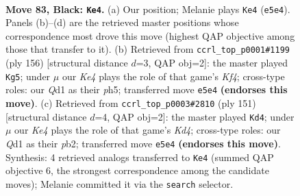 \documentclass[11pt]{article}
\begin{document}
\clearpage

\begin{figure}[p]\centering
\begin{subfigure}{0.46\textwidth}\centering
\resizebox{\linewidth}{!}{%
\newchessgame
\chessboard[
  setfen={8/8/1p6/p3k3/2P5/8/K7/3q4 b - - 23 83},
  showmover=false,
  pgfstyle=straightmove, color=movearrow, markmove={e5-e4}
]}
\caption{}
\end{subfigure}\hfill
\begin{subfigure}{0.46\textwidth}\centering
\resizebox{\linewidth}{!}{%
\newchessgame
\chessboard[
  setfen={6k1/8/8/p6p/2P2K2/1P6/8/8 w - - 5 79},
  showmover=false,
  pgfstyle=straightmove, color=movearrow, markmove={f4-g5}
]}
\caption{}
\end{subfigure}
\\[4pt]
\begin{subfigure}{0.46\textwidth}\centering
\resizebox{\linewidth}{!}{%
\newchessgame
\chessboard[
  setfen={8/6p1/6Pp/3k4/8/5K2/1P6/8 b - - 4 76},
  showmover=false,
  pgfstyle=straightmove, color=movearrow, markmove={d5-d4}
]}
\caption{}
\end{subfigure}\hfill

\caption{\textbf{Move 83, Black: \texttt{Ke4}.} (a) Our position; Melanie plays \texttt{Ke4} (\texttt{e5e4}). Panels (b)--(d) are the retrieved master positions whose correspondence most drove this move (highest QAP objective among those that transfer to it). (b) Retrieved from \texttt{ccrl\_top\_p0001\#1199} (ply 156) [structural distance $d$=3, QAP obj=2]: the master played \texttt{Kg5}; under $\mu$ our \emph{Ke4} plays the role of that game's \emph{Kf4}; cross-type roles: our \emph{Q}d1 as their \emph{p}h5; transferred move \texttt{e5e4} \textbf{(endorses this move)}. (c) Retrieved from \texttt{ccrl\_top\_p0003\#2810} (ply 151) [structural distance $d$=4, QAP obj=2]: the master played \texttt{Kd4}; under $\mu$ our \emph{Ke4} plays the role of that game's \emph{Kd4}; cross-type roles: our \emph{Q}d1 as their \emph{p}b2; transferred move \texttt{e5e4} \textbf{(endorses this move)}. Synthesis: 4 retrieved analogs transferred to \texttt{Ke4} (summed QAP objective 6, the strongest correspondence among the candidate moves); Melanie committed it via the \texttt{search} selector.}
\label{fig:thought-m165}
\end{figure}

\clearpage
\end{document}
